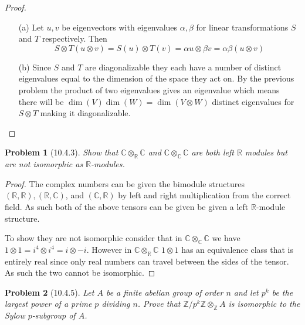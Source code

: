 \documentclass[10pt]{article}
\newcommand{\sk}{\vskip 10mm}
\newcommand{\bb}[1]{\mathbb{#1}}
\theoremstyle{plain}
\newtheorem{problem}{Problem}
\theoremstyle{remark}
\begin{document}
\begin{proof}
  \begin{enumerate}
  \item[(a)] Let $u,v$ be eigenvectors with eigenvalues $\alpha,\beta$ for linear
    transformations $S$ and $T$ respectively. Then
    \[
      S\otimes T(u\otimes v) = S(u)\otimes T(v)= \alpha u\otimes \beta v = \alpha\beta (u\otimes v)
    \]
  \item[(b)] Since $S$ and $T$ are diagonalizable they each have a number
    of distinct eigenvalues equal to the dimension of the space they act on.
    By the previous problem the product of two eigenvalues gives an eigenvalue
    which means there will be $\dim(V)\dim(W)=\dim(V\otimes W)$ distinct eigenvalues
    for $S\otimes T$ making it diagonalizable.
  \end{enumerate}
\end{proof}

\sk

\begin{problem}[10.4.3]
  Show that $\bb{C}\otimes_{\bb{R}}\bb{C}$ and $\bb{C}\otimes_{\bb{C}}\bb{C}$
  are both left $\bb{R}$ modules but are not isomorphic as $\bb{R}$-modules.
\end{problem}

\begin{proof}
  The complex numbers can be given the bimodule structures
  $(\bb{R},\bb{R}),(\bb{R},\bb{C})$, and $(\bb{C},\bb{R})$ by left
  and right multiplication from the correct field. As such both of the
  above tensors can be given be given a left $\bb{R}$-module structure.

  To show they are not isomorphic consider that in $\bb{C}\otimes_{\bb{C}}\bb{C}$
  we have $1\otimes 1=i^4\otimes i^4=i\otimes -i$. However in $\bb{C}\otimes_{\bb{R}}\bb{C}$
  $1\otimes 1$ has an equivalence class that is entirely real since only real numbers
  can travel between the sides of the tensor. As such the two cannot be
  isomorphic.
\end{proof}

\sk

\begin{problem}[10.4.5]
  Let $A$ be a finite abelian group of order $n$ and let $p^k$ be the largest
  power of a prime $p$ dividing $n$. Prove that
  $\bb{Z}/p^k\bb{Z}\otimes_{\bb{Z}}A$ is isomorphic to the Sylow $p$-subgroup
  of $A$.
\end{problem}
\end{document}
